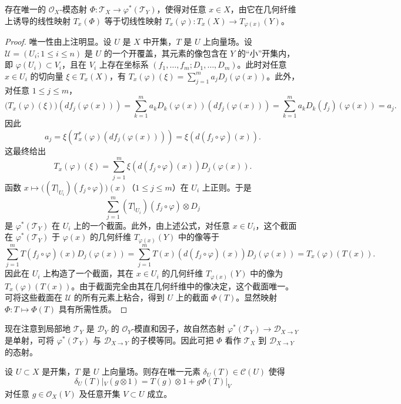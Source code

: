 \begin{lemma}\label{lem:4.1.4}
存在唯一的 $\mathcal{O}_X$-模态射 $\Phi:\mathcal{T}_X\to\varphi^*(\mathcal{T}_Y)$，使得对任意 $x\in X$，由它在几何纤维上诱导的线性映射 $T_x(\Phi)$ 等于切线性映射
$T_x(\varphi):T_x(X)\to T_{\varphi(x)}(Y)$。
\end{lemma}

\begin{proof}
唯一性由上注明显。设 $U$ 是 $X$ 中开集，$T$ 是 $U$ 上向量场。设 $\mathcal{U}=(U_i;1\le i\le n)$ 是 $U$ 的一个开覆盖，其元素的像包含在 $Y$ 的“小”开集内，即 $\varphi(U_i)\subset V_i$，且在 $V_i$ 上存在坐标系
$(f_1,\dots,f_m;D_1,\dots,D_m)$。此时对任意 $x\in U_i$ 的切向量 $\xi\in T_x(X)$，有
$T_x(\varphi)(\xi)=\sum_{j=1}^m a_jD_j(\varphi(x))$。此外，对任意 $1\le j\le m$，
$$\bigl(T_x(\varphi)(\xi)\bigr)(df_j(\varphi(x)))=\sum_{k=1}^m a_kD_k(\varphi(x))(df_j(\varphi(x)))
=\sum_{k=1}^m a_kD_k(f_j)(\varphi(x))=a_j.$$
因此
$$a_j=\xi(T_x^*(\varphi)(df_j(\varphi(x))))=\xi(d(f_j\circ\varphi)(x)).$$
这最终给出
$$T_x(\varphi)(\xi)=\sum_{j=1}^m\xi(d(f_j\circ\varphi)(x))D_j(\varphi(x)).$$
函数 $x\mapsto\bigl((T|_{U_i})(f_j\circ\varphi)\bigr)(x)$（$1\le j\le m$）在 $U_i$ 上正则。于是
$$\sum_{j=1}^m(T|_{U_i})(f_j\circ\varphi)\otimes D_j$$
是 $\varphi^*(\mathcal{T}_Y)$ 在 $U_i$ 上的一个截面。此外，由上述公式，对任意 $x\in U_i$，这个截面在 $\varphi^*(\mathcal{T}_Y)$ 于 $\varphi(x)$ 的几何纤维 $T_{\varphi(x)}(Y)$ 中的像等于
$$\sum_{j=1}^m T(f_j\circ\varphi)(x)D_j(\varphi(x))=\sum_{j=1}^m T(x)(d(f_j\circ\varphi)(x))D_j(\varphi(x))=T_x(\varphi)(T(x)).$$
因此在 $U_i$ 上构造了一个截面，其在 $x\in U_i$ 的几何纤维 $T_{\varphi(x)}(Y)$ 中的像为 $T_x(\varphi)(T(x))$。由于截面完全由其在几何纤维中的像决定，这个截面唯一。可将这些截面在 $\mathcal{U}$ 的所有元素上粘合，得到 $U$ 上的截面 $\Phi(T)$。显然映射 $\Phi:T\mapsto\Phi(T)$ 具有所需性质。
\end{proof}

现在注意到局部地 $\mathcal{T}_Y$ 是 $\mathcal{D}_Y$ 的 $\mathcal{O}_Y$-模直和因子，故自然态射
$\varphi^*(\mathcal{T}_Y)\to\mathcal{D}_{X\to Y}$ 是单射，可将 $\varphi^*(\mathcal{T}_Y)$ 与 $\mathcal{D}_{X\to Y}$ 的子模等同。因此可把 $\Phi$ 看作 $\mathcal{T}_X$ 到 $\mathcal{D}_{X\to Y}$ 的态射。

\begin{lemma}\label{lem:4.1.5}
设 $U\subset X$ 是开集，$T$ 是 $U$ 上向量场。则存在唯一元素 $\delta_U(T)\in\mathcal{C}(U)$ 使得
$$\delta_U(T)|_V(g\otimes 1)=T(g)\otimes 1+g\Phi(T)|_V$$
对任意 $g\in\mathcal{O}_X(V)$ 及任意开集 $V\subset U$ 成立。
\end{lemma}

